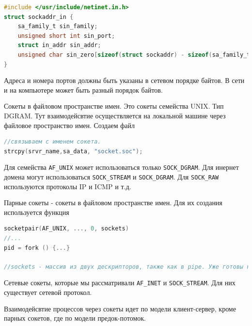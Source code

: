 \begin{lstlisting}[language=c]
#include </usr/include/netinet.in.h>
struct sockaddr_in {
	sa_family_t sin_family;
	unsigned short int sin_port;
	struct in_addr sin_addr;
	unsigned char sin_zero[sizeof(struct sockaddr) - sizeof(sa_family_t) - sizeof(uint16_t) - sizeof(struct in_addr)];
}
\end{lstlisting}

Адреса и номера портов должны быть указаны в сетевом порядке байтов. В сети и на компьютере может быть разный порядок байтов.

Сокеты в файловом пространстве имен. Это сокеты семейства UNIX. Тип DGRAM. Тут взаимодейсвтие осуществляется на локальной машине через файловое пространство имен. Создаем файл

\begin{lstlisting}[language=c]
//связываем с именем сокета.
strcpy(srvr_name,sa_data, "socket.soc");
\end{lstlisting}

Для семейства \verb|AF_UNIX| может использоваться только \verb|SOCK_DGRAM|. Для инернет домена могут использоваться \verb|SOCK_STREAM| и \verb|SOCK_DGRAM|. Для \verb|SOCK_RAW|  используются протоколы IP и ICMP и т.д.

Парные сокеты - сокеты в файловом пространстве имен. Для их создания используется функция 

\begin{lstlisting}[language=c]
socketpair(AF_UNIX, ..., 0, sockets)
//...
pid = fork () {...}

//sockets - массив из двух дескрипторов, также как в pipe. Уже готовы к передаче данных и можно сразу применять системные вызовы read/write. fork получает оба дескрпитора, один из которых он должен закрыть с помощью системного вызова close. Несмотря на то, что не используется модель клиент-сервер, которая характерная для сокетов, но если посомтреть, то функция socketpair получает семейство и тип, на основании которых определяется протокол, поэтому считаются полноценными сокетами. Это сделано для общности подхода реализации взаимодейсвтия через сокеты.
\end{lstlisting}

Сетевые сокеты, которые мы рассматривали \verb|AF_INET| и \verb|SOCK_STREAM|. Для них существует сетевой протокол.

Взаимодейсвтие процессов через сокеты идет по модели клиент-сервер, кроме парных сокетов, где по модели предок-потомок.

